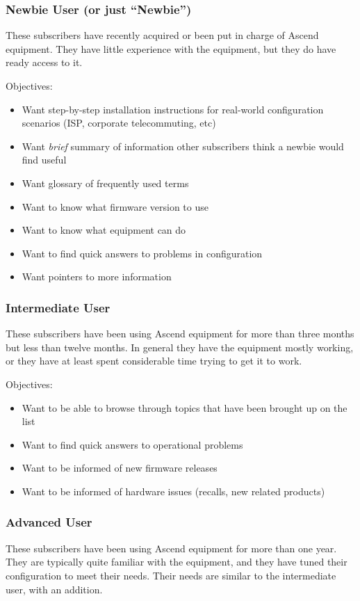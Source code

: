 \subsubsection{Newbie User (or just ``Newbie'')}
These subscribers have recently acquired or been put in charge of Ascend
equipment. They have little experience with the equipment, but they do have
ready access to it.

Objectives:
\begin{itemize}
\item Want step-by-step installation instructions for real-world configuration
  scenarios (ISP, corporate telecommuting, etc)
\item Want {\em brief} summary of information other subscribers think a newbie
  would find useful
\item Want glossary of frequently used terms
\item Want to know what firmware version to use
\item Want to know what equipment can do
\item Want to find quick answers to problems in configuration
\item Want pointers to more information
\end{itemize}

\subsubsection{Intermediate User}
These subscribers have been using Ascend equipment for more than three months
but less than twelve months. In general they have the equipment mostly working,
or they have at least spent considerable time trying to get it to work.

Objectives:
\begin{itemize}
\item Want to be able to browse through topics that have been brought up on the
  list
\item Want to find quick answers to operational problems
\item Want to be informed of new firmware releases
\item Want to be informed of hardware issues (recalls, new related products)
\end{itemize}

\subsubsection{Advanced User}
These subscribers have been using Ascend equipment for more than one year. They
are typically quite familiar with the equipment, and they have tuned their
configuration to meet their needs. Their needs are similar to the intermediate
user, with an addition.

